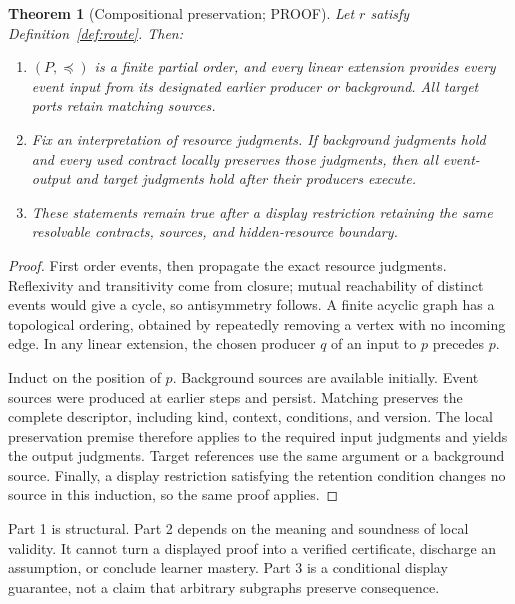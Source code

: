 \documentclass[11pt,a4paper]{article}
\newtheorem{theorem}[definition]{Theorem}
\theoremstyle{remark}
\newcommand{\status}[1]{\textsf{\small #1}}
\begin{document}
\begin{theorem}[Compositional preservation; \status{PROOF}]
\label{thm:preservation}
Let \(r\) satisfy Definition~\ref{def:route}. Then:
\begin{enumerate}
\item \((P,\preceq)\) is a finite partial order, and every linear extension
provides every event input from its designated earlier producer or background.
All target ports retain matching sources.
\item Fix an interpretation of resource judgments. If background
judgments hold and every used contract locally preserves those judgments,
then all event-output and target judgments hold after their producers execute.
\item These statements remain true after a display restriction retaining
the same resolvable contracts, sources, and hidden-resource boundary.
\end{enumerate}
\end{theorem}
\begin{proof}
First order events, then propagate the exact resource judgments.
Reflexivity and transitivity come from closure; mutual reachability of distinct
events would give a cycle, so antisymmetry follows. A finite acyclic graph
has a topological ordering, obtained by repeatedly removing a vertex with
no incoming edge. In any linear extension, the chosen producer \(q\) of an
input to \(p\) precedes \(p\).

Induct on the position of \(p\). Background sources are available initially.
Event sources were produced at earlier steps and persist. Matching preserves
the complete descriptor, including kind, context, conditions, and version.
The local preservation premise therefore applies to the required input
judgments and yields the output judgments. Target references use the same
argument or a background source. Finally, a display restriction satisfying
the retention condition changes no source in this induction, so the same
proof applies.
\end{proof}
Part 1 is structural. Part 2 depends on the meaning and soundness of local
validity. It cannot turn a displayed proof into a verified certificate,
discharge an assumption, or conclude learner mastery. Part 3 is a conditional
display guarantee, not a claim that arbitrary subgraphs preserve consequence.
\end{document}
